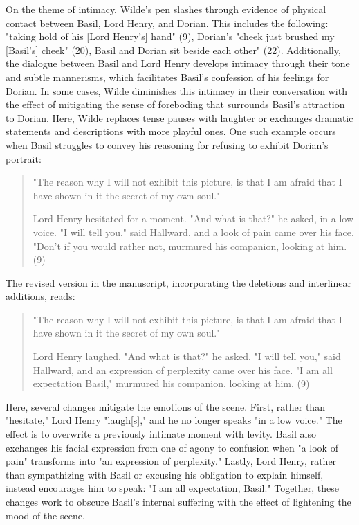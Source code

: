 \documentclass[11pt]{article}
\begin{document}
On the theme of intimacy, Wilde's pen slashes through evidence of
physical contact between Basil, Lord Henry, and Dorian. This includes
the following: "taking hold of his [Lord Henry's] hand" (9), Dorian's
"cheek just brushed my [Basil's] cheek" (20), Basil and Dorian sit
beside each other" (22). Additionally, the dialogue between Basil and
Lord Henry develops intimacy through their tone and subtle mannerisms,
which facilitates Basil's confession of his feelings for Dorian. In
some cases, Wilde diminishes this intimacy in their conversation with
the effect of mitigating the sense of foreboding that surrounds
Basil's attraction to Dorian. Here, Wilde replaces tense pauses with
laughter or exchanges dramatic statements and descriptions with more
playful ones.  One such example occurs when Basil struggles to convey
his reasoning for refusing to exhibit Dorian's portrait:
\begin{quote}
"The reason why I will not exhibit this picture, is that I am afraid
that I have shown in it the secret of my own soul."

Lord Henry hesitated for a moment. "And what is that?" he asked, in a
low voice. "I will tell you," said Hallward, and a look of pain came
over his face. "Don't if you would rather not, murmured his companion,
looking at him. (9)
\end{quote}
The revised version in the manuscript, incorporating the deletions and
interlinear additions, reads:
\begin{quote}
"The reason why I will not exhibit this picture, is that I am afraid
that I have shown in it the secret of my own soul."

Lord Henry laughed. "And what is that?" he asked. "I will tell you,"
said Hallward, and an expression of perplexity came over his face. "I
am all expectation Basil," murmured his companion, looking at him. (9)
\end{quote}
Here, several changes mitigate the emotions of the scene. First,
rather than "hesitate," Lord Henry "laugh[s]," and he no longer speaks
"in a low voice." The effect is to overwrite a previously intimate
moment with levity. Basil also exchanges his facial expression from
one of agony to confusion when "a look of pain" transforms into "an
expression of perplexity." Lastly, Lord Henry, rather than
sympathizing with Basil or excusing his obligation to explain himself,
instead encourages him to speak: "I am all expectation, Basil."
Together, these changes work to obscure Basil's internal suffering
with the effect of lightening the mood of the scene.
\end{document}
